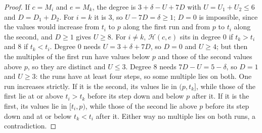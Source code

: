 \documentclass[11pt,reqno]{amsart}
\theoremstyle{plain}
\theoremstyle{definition}
\theoremstyle{remark}
\newcommand{\cH}{\mathcal{H}}
\begin{document}
\begin{proof}
If $c=M_{i}$ and $e=M_{k}$, the degree is $3+\delta-U+7D$ with
$U=U_{1}+U_{2}\le6$ and $D=D_{1}+D_{2}$. For $i=k$ it is $3$, so
$U-7D=\delta\ge1$; $D=0$ is impossible, since the values would increase from
$t_{i}$ to $p$ along the first run and from $p$ to $t_{i}$ along the second,
and $D\ge1$ gives $U\ge8$. For $i\ne k$, $\cH(c,e)$ sits in degree $0$ if
$t_{k}>t_{i}$ and $8$ if $t_{k}<t_{i}$. Degree $0$ needs $U=3+\delta+7D$,
so $D=0$ and $U\ge4$; but then the multiples of the first run have values
below $p$ and those of the second values above $p$, so they are distinct and
$U\le3$. Degree $8$ needs $7D-U=5-\delta$, so $D=1$ and $U\ge3$: the runs
have at least four steps, so some multiple lies on both. One run increases
strictly. If it is the second, its values lie in $(p,t_{k}]$, while those of
the first lie at or above $t_{i}>t_{k}$ before its step down and below $p$
after it. If it is the first, its values lie in $[t_{i},p)$, while those of
the second lie above $p$ before its step down and at or below $t_{k}<t_{i}$
after it. Either way no multiple lies on both runs, a contradiction.


\end{proof}
\end{document}
